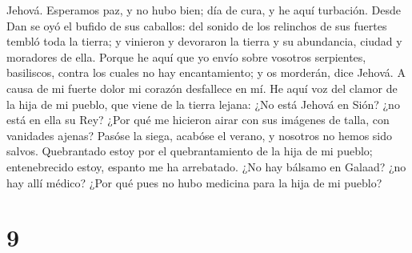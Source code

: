 Jehová.  Esperamos paz, y no hubo bien; día de cura, y he
aquí turbación.  Desde Dan se oyó el bufido de sus
caballos: del sonido de los relinchos de sus fuertes tembló toda la
tierra; y vinieron y devoraron la tierra y su abundancia, ciudad y
moradores de ella.  Porque he aquí que yo envío sobre
vosotros serpientes, basiliscos, contra los cuales no hay encantamiento;
y os morderán, dice Jehová.  A causa de mi fuerte dolor
mi corazón desfallece en mí.  He aquí voz del clamor de
la hija de mi pueblo, que viene de la tierra lejana: ¿No está Jehová en
Sión? ¿no está en ella su Rey? ¿Por qué me hicieron airar con sus
imágenes de talla, con vanidades ajenas?  Pasóse la
siega, acabóse el verano, y nosotros no hemos sido salvos.
 Quebrantado estoy por el quebrantamiento de la hija de
mi pueblo; entenebrecido estoy, espanto me ha arrebatado.
 ¿No hay bálsamo en Galaad? ¿no hay allí médico? ¿Por qué
pues no hubo medicina para la hija de mi pueblo?

\hypertarget{section-8}{%
\section{9}\label{section-8}}


